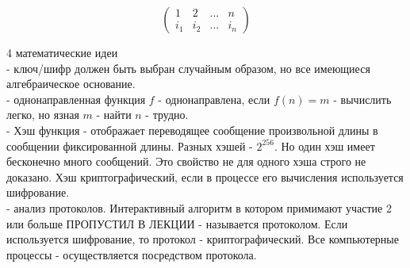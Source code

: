 \begin{displaymath}
\left( \begin{array}{lccr}
1 & 2 & ... & n \\
i_1 & i_2 & ... & i_n
\end{array}\right)
\end{displaymath}

\begin{center}
\end{center}

4 математические идеи\\

 - ключ/шифр должен быть выбран случайным образом, но все 
имеющиеся алгебраическое основание.\\
 - однонаправленная функция $f$ - однонаправлена, если 
$f(n) = m$ - вычислить легко, но язная $m$ - найти $n$ - трудно.\\
 - Хэш функция - отображает переводящее сообщение произвольной
длины в сообщении фиксированной длины. Разных хэшей - $2^256$. Но один хэш имеет
бесконечно много сообщений. Это свойство не для одного хэша  строго не доказано.
Хэш криптографический, если в процессе его вычисления используется шифрование.\\
 - анализ протоколов. Интерактивный алгоритм в котором 
примимают участие 2 или больше ПРОПУСТИЛ В ЛЕКЦИИ - называется протоколом.
Если используется шифрование, то протокол - криптографический. Все компьютерные
процессы - осуществляется посредством протокола.